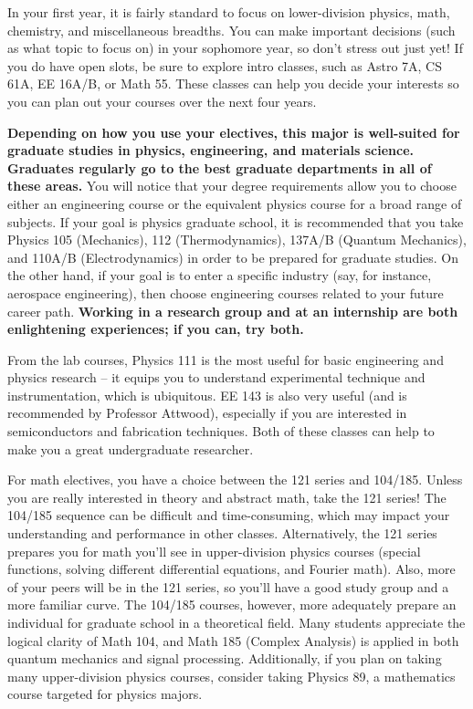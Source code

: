 In your first year, it is fairly standard to focus on lower-division physics, math, chemistry, and miscellaneous breadths. You can make important decisions (such as what topic to focus on) in your sophomore year, so don't stress out just yet! If you do have open slots, be sure to explore intro classes, such as Astro 7A, CS 61A, EE 16A/B, or Math 55. These classes can help you decide your interests so you can plan out your courses over the next four years.

\textbf{Depending on how you use your electives, this major is well-suited for graduate studies in physics, engineering, and materials science. Graduates regularly go to the best graduate departments in all of these areas.} You will notice that your degree requirements allow you to choose either an engineering course or the equivalent physics course for a broad range of subjects. If your goal is physics graduate school, it is recommended that you take Physics 105 (Mechanics), 112 (Thermodynamics), 137A/B (Quantum Mechanics), and 110A/B (Electrodynamics) in order to be prepared for graduate studies. On the other hand, if your goal is to enter a specific industry (say, for instance, aerospace engineering), then choose engineering courses related to your future career path. \textbf{Working in a research group and at an internship are both enlightening experiences; if you can, try both.}

From the lab courses, Physics 111 is the most useful for basic engineering and physics research – it equips you to understand experimental technique and instrumentation, which is ubiquitous. EE 143 is also very useful (and is recommended by Professor Attwood), especially if you are interested in semiconductors and fabrication techniques. Both of these classes can help to make you a great undergraduate researcher.

For math electives, you have a choice between the 121 series and 104/185. Unless you are really interested in theory and abstract math, take the 121 series! The 104/185 sequence can be difficult and time-consuming, which may impact your understanding and performance in other classes. Alternatively, the 121 series prepares you for math you’ll see in upper-division physics courses (special functions, solving different differential equations, and Fourier math). Also, more of your peers will be in the 121 series, so you’ll have a good study group and a more familiar curve. The 104/185 courses, however, more adequately prepare an individual for graduate school in a theoretical field. Many students appreciate the logical clarity of Math 104, and Math 185 (Complex Analysis) is applied in both quantum mechanics and signal processing. Additionally, if you plan on taking many upper-division physics courses, consider taking Physics 89, a mathematics course targeted for physics majors.

